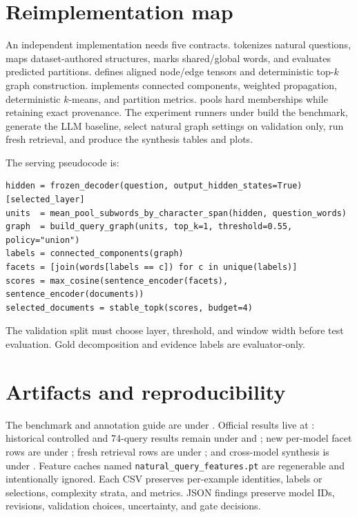 \documentclass[11pt]{article}
\begin{document}
\appendix
\section{Reimplementation map}
An independent implementation needs five contracts.  tokenizes natural questions, maps dataset-authored structures, marks shared/global words, and evaluates predicted partitions.  defines aligned node/edge tensors and deterministic top-$k$ graph construction.  implements connected components, weighted propagation, deterministic $k$-means, and partition metrics.  pools hard memberships while retaining exact provenance. The experiment runners under  build the benchmark, generate the LLM baseline, select natural graph settings on validation only, run fresh retrieval, and produce the synthesis tables and plots.

The serving pseudocode is:
\begin{verbatim}
hidden = frozen_decoder(question, output_hidden_states=True)[selected_layer]
units  = mean_pool_subwords_by_character_span(hidden, question_words)
graph  = build_query_graph(units, top_k=1, threshold=0.55, policy="union")
labels = connected_components(graph)
facets = [join(words[labels == c]) for c in unique(labels)]
scores = max_cosine(sentence_encoder(facets), sentence_encoder(documents))
selected_documents = stable_topk(scores, budget=4)
\end{verbatim}
The validation split must choose layer, threshold, and window width before test evaluation. Gold decomposition and evidence labels are evaluator-only.

\section{Artifacts and reproducibility}
The benchmark and annotation guide are under . Official results live at : historical controlled and 74-query results remain under  and ; new per-model facet rows are under ; fresh retrieval rows are under ; and cross-model synthesis is under . Feature caches named \texttt{natural\_query\_features.pt} are regenerable and intentionally ignored. Each CSV preserves per-example identities, labels or selections, complexity strata, and metrics. JSON findings preserve model IDs, revisions, validation choices, uncertainty, and gate decisions.
\end{document}

